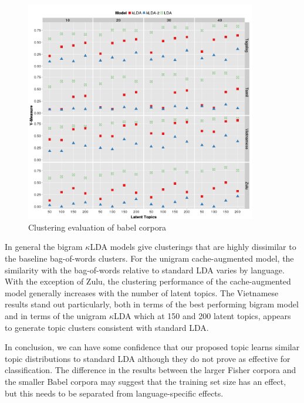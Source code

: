 \begin{figure}
\centering
\includegraphics[width=0.9\textwidth]{graphs/ch6/cluster-tfidf-babel.png}
\caption[Clustering evaluation of Babel corpora]{Clustering evaluation of babel corpora \label{fig6:babelClust}}

\end{figure}

In general the bigram $\kappa$LDA models give clusterings that are highly dissimilar to the baseline bag-of-words clusters.  For the unigram cache-augmented model, the similarity with the bag-of-words relative to standard LDA varies by language.  With the exception of Zulu, the clustering performance of the cache-augmented model generally increases with the number of latent topics.  The Vietnamese results stand out particularly, both in terms of the best performing bigram model and in terms of the unigram $\kappa$LDA which at 150 and 200 latent topics, appears to generate topic clusters consistent with standard LDA. 

In conclusion, we can have some confidence that our proposed topic learns similar topic distributions to standard LDA although they do not prove as effective for classification.  The difference in the results between the larger Fisher corpora and the smaller Babel corpora may suggest that the training set size has an effect, but this needs to be separated from language-specific effects.


